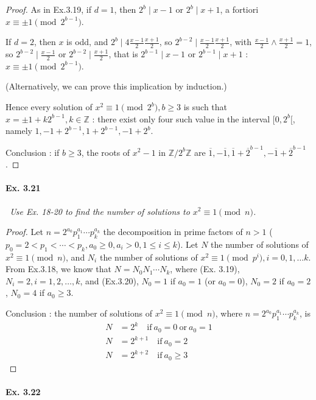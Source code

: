 \documentclass[11pt,a4paper]{article}
\newcommand{\Z}{\mathbb{Z}}
\begin{document}
{\begin{proof}
As in Ex.3.19, if $d=1$, then $2^b \mid x-1$ or $2^b \mid x+1$, a fortiori $x \equiv \pm 1 \pmod{2^{b-1}}$.

If $d=2$, then $x$ is odd, and $2^b \mid 4\frac{x-1}{2}\frac{x+1}{2}$,  so $2^{b-2} \mid \frac{x-1}{2}\frac{x+1}{2}$, with $\frac{x-1}{2} \wedge \frac{x+1}{2}=1$, so $2^{b-2} \mid \frac{x-1}{2}$ or $2^{b-2} \mid \frac{x+1}{2}$, that is $2^{b-1} \mid x-1$ or $2^{b-1} \mid x+1$ : $x \equiv \pm 1 \pmod{2^{b-1}}$.

(Alternatively, we can prove this implication by induction.)

Hence every solution of $x^2 \equiv 1\pmod{2^b}, b\geq 3$ is such that $x = \pm1+k2^{b-1}, k \in \Z$ : there exist only four such value in the interval $[0,2^b[$, namely $1,-1+2^{b-1},1+2^{b-1},-1+2^b$.

Conclusion : if $b\geq 3$, the roots of $x^2-1$ in $\Z/2^b\Z$ are $ \overline{1}, -\overline{1}, \overline{1} + \overline{2}^{b-1},-\overline{1} + \overline{2}^{b-1}$.
\end{proof}

\paragraph{Ex. 3.21}

{\it \
Use Ex. 18-20 to find the number of solutions to $x^2 \equiv 1 \pmod n$.
}

\begin{proof}
Let $n = 2^{a_0}p_1^{a_1}\cdots p_k^{a_k}$ the decomposition in prime factors of $n>1$ ($p_0=2<p_1<\cdots<p_k, a_0\geq 0, a_i>0, 1\leq i \leq k$). Let $N$ the number of solutions of $x^2 \equiv 1 \pmod n$, and $N_i$ the number of solutions of $x^2 \equiv 1 \pmod {p^i}, i = 0,1,\ldots k$. From Ex.3.18, we know that $N = N_0N_1\cdots N_k$, where (Ex. 3.19), $N_i = 2, i=1,2,\ldots,k$, and (Ex.3.20), $N_0=1$ if $a_0=1$ (or $a_0 = 0$), $N_0 = 2$ if $a_0 = 2$, $N_0=4$ if $a_0\geq 3$.

Conclusion : the number of solutions of $x^2 \equiv 1 \pmod n$,  where $n = 2^{a_0}p_1^{a_1}\cdots p_k^{a_k}$, is
\begin{align*}
N &= 2^k\quad \mathrm{if}\ a_0=0\ \mathrm{or}\ a_0 = 1\\
N &= 2^{k+1} \quad \mathrm{if}\ a_0=2\\
N &= 2^{k+2} \quad \mathrm{if}\ a_0\geq 3
\end{align*}
\end{proof}

\paragraph{Ex. 3.22}

}
\end{document}
